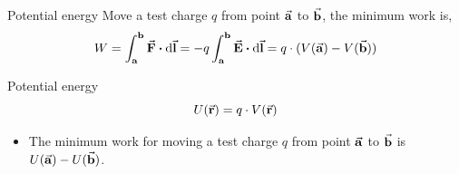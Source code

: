 \documentclass{beamer}
\begin{document}
\begin{frame}{Potential energy}
    Move a test charge $q$ from point $\va{a}$ to $\va{b}$, the minimum work is,
    \begin{equation}
        W = \int_{\vb{a}}^{\vb{b}} \va{F} \vdot \dd{\va{l}} = -q \int_{\vb{a}}^{\vb{b}} \va{E} \vdot \dd{\va{l}} = q \cdot (V(\va{a}) - V(\va{b}))
    \end{equation}

    \begin{block}{Potential energy}
        \begin{equation}
            U(\va{r}) = q \cdot V(\va{r})
        \end{equation}
    \end{block}

    \begin{itemize}
        \item The minimum work for moving a test charge $q$ from point $\va{a}$ to $\va{b}$ is $U(\va{a}) - U(\va{b})$.
    \end{itemize}

\end{frame}
\end{document}
